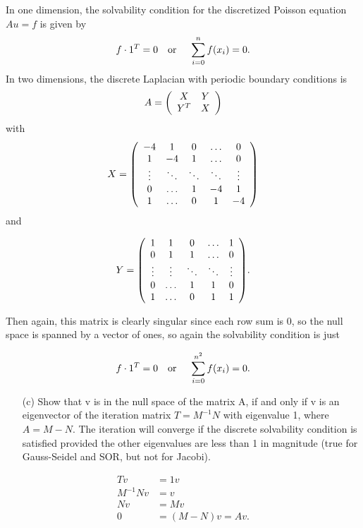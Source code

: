 \documentclass[12pt]{article}
\begin{document}
In one dimension, the solvability condition for the discretized Poisson equation $Au = f$ is given by
$$f \cdot 1^T = 0 \text{\quad or \quad} \sum_{i=0}^n f(x_i) = 0.$$
In two dimensions, the discrete Laplacian with periodic boundary conditions is
     $$
            A = \qty(\begin{array}{cc}
                X & Y \\
                Y^T & X
            \end{array})
      $$  
with
        $$
            X = \qty(\begin{array}{ccccc}
                -4 & 1 & 0 & \dots & 0 \\
                1 & -4 & 1 & \dots & 0 \\
                \vdots & \ddots & \ddots & \ddots & \vdots \\
                0 & \dots & 1 & -4 & 1 \\
                1 & \dots & 0 & 1 & -4
            \end{array}) $$
        and 
      
         $$  Y = \qty(\begin{array}{ccccc}
                1 & 1 & 0 & \dots & 1 \\
                0 & 1 & 1 & \dots & 0 \\
                \vdots & \vdots & \ddots & \ddots & \vdots \\
                0 & \dots & 1 & 1 & 0 \\
                1 & \dots & 0 & 1 & 1
            \end{array}). $$

Then again, this matrix is clearly singular since each row sum is 0, so the null space is spanned by a vector of ones, so again the solvability condition is just            

$$f \cdot 1^T = 0 \text{\quad or \quad} \sum_{i=0}^{n^2} f(x_i) = 0.$$
\begin{itemize}
\item[(c)]  Show that v is in the null space of the matrix A, if and only if v is an eigenvector of the
iteration matrix $T = M^{-1}N$ with eigenvalue 1, where $A = M - N$. The iteration will converge if the discrete solvability condition is satisfied provided the other eigenvalues are less than 1 in magnitude (true for Gauss-Seidel and SOR, but not for Jacobi).
\end{itemize}

\begin{align*}
Tv &= 1 v \\
M^{-1}Nv &= v \\
N v &=  M v \\
0 &= (M-N) v = Av.
\end{align*}
\end{document}
